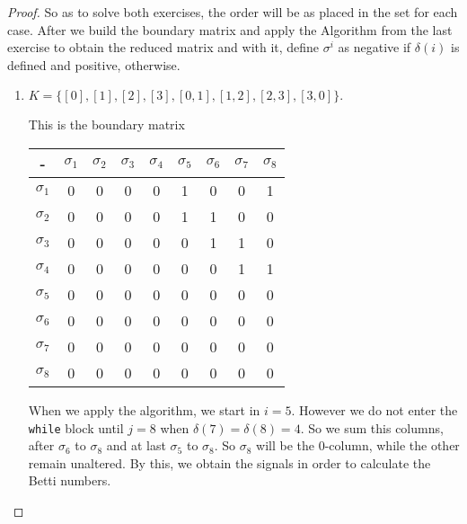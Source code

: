 \begin{proof}

So as to solve both exercises, the order will be as placed in the set for each
case.
After we build the boundary matrix and apply the Algorithm from the last
exercise to obtain the reduced matrix and with it, define $\sigma^i$ as negative
if $\delta(i)$ is defined and positive, otherwise. 

\begin{enumerate}
    \item    $K = \{[0], [1], [2], [3], [0, 1], [1, 2], [2, 3], [3, 0]\}.$
    
    This is the boundary matrix

    \begin{center}
        \begin{tabular}{|c|c|c|c|c|c|c|c|c|}
        \hline
        -          & $\sigma_1$ & $\sigma_2$ & $\sigma_3$ & $\sigma_4$ & $\sigma_5$ & $\sigma_6$ & $\sigma_7$ & $\sigma_8$ \\ \hline
        $\sigma_1$ & 0          & 0          & 0          & 0          & 1          & 0          & 0          & 1          \\ \hline
        $\sigma_2$ & 0          & 0          & 0          & 0          & 1          & 1          & 0          & 0          \\ \hline
        $\sigma_3$ & 0          & 0          & 0          & 0          & 0          & 1          & 1          & 0          \\ \hline
        $\sigma_4$ & 0          & 0          & 0          & 0          & 0          & 0          & 1          & 1          \\ \hline
        $\sigma_5$ & 0          & 0          & 0          & 0          & 0          & 0          & 0          & 0          \\ \hline
        $\sigma_6$ & 0          & 0          & 0          & 0          & 0          & 0          & 0          & 0          \\ \hline
        $\sigma_7$ & 0          & 0          & 0          & 0          & 0          & 0          & 0          & 0          \\ \hline
        $\sigma_8$ & 0          & 0          & 0          & 0          & 0          & 0          & 0          & 0          \\ \hline
        \end{tabular}
    \end{center}

    When we apply the algorithm, we start in $i = 5$. However we do not enter
    the \texttt{while} block until $j = 8$ when $\delta(7) =
    \delta(8) = 4$. So we sum this columns, after $\sigma_6$ to $\sigma_8$ and
    at last $\sigma_5$ to $\sigma_8$. So $\sigma_8$ will be the 0-column,
    while the other remain unaltered. By this, we obtain the signals in order
    to calculate the Betti numbers. 


\end{enumerate}
\end{proof}
